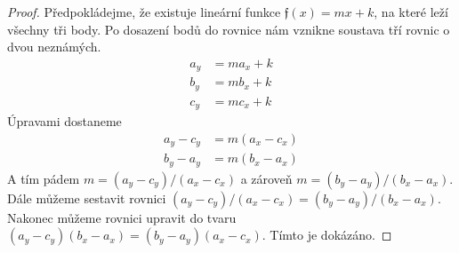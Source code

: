 \begin{proof}
  Předpokládejme, že existuje lineární funkce $\mathfrak{f}(x) = mx+k$, na které leží všechny tři body. Po dosazení bodů do rovnice nám vznikne soustava tří rovnic o dvou neznámých.
  \begin{align*}
    a_y & = ma_x+k \\
    b_y & = mb_x+k \\
    c_y & = mc_x+k
  \end{align*}
  Úpravami dostaneme
  \begin{align*}
    a_y-c_y & = m(a_x-c_x) \\
    b_y-a_y & = m(b_x-a_x)
  \end{align*}
  A tím pádem $m = (a_y-c_y)/(a_x-c_x)$ a zároveň $ m=(b_y-a_y)/(b_x-a_x)$. Dále můžeme sestavit rovnici $(a_y-c_y)/(a_x-c_x) = (b_y-a_y)/(b_x-a_x)$. Nakonec můžeme rovnici upravit do tvaru $(a_y-c_y)(b_x-a_x) = (b_y-a_y)(a_x-c_x)$. Tímto je  dokázáno.
\end{proof}